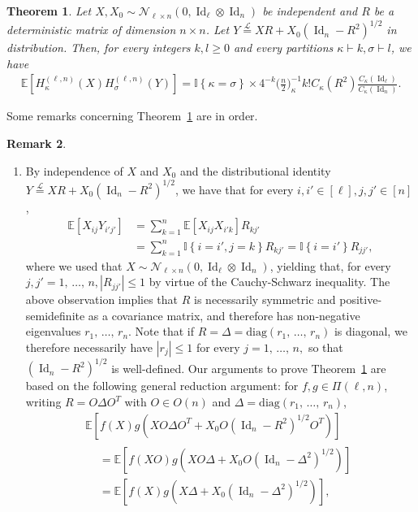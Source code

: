 \documentclass[10pt]{amsart}
\newtheorem{theo}{Theorem}[section]
\theoremstyle{definition}\newtheorem{defi}[theo]{Definition}\newtheorem{rema}[theo]{Remark}\newtheorem{exam}[theo]{Example}\newtheorem{exem}[theo]{Example}\newtheorem{nota}[theo]{Notation}
\DeclareMathOperator{\Id}{Id}
\newcommand{\scN}{\mathscr{N}}
\newcommand{\diag}{\mathrm{diag}}
\newcommand{\E}[1]{\mathbb{E}\left[#1\right]}
\newcommand{\eqLaw}{ \overset{\mathcal{L}}{=} }
\newcommand{\ind}[1]{\mathbb{I}
\left\{#1\right\}}
\newcommand*{\alphenumi}{\renewcommand*{\theenumi}{\alph{enumi}}}
\begin{document}
\begin{theo}\label{OrtA}
Let $X, X_0\sim \scN_{\ell \times n}(0, \Id_{\ell} \otimes \Id_n)$ be independent and $R$ be a deterministic matrix of dimension $n\times n$. Let $Y \eqLaw XR+X_0(\Id_n-R^2)^{1/2}$ in distribution. Then, for every integers $k,l \geq0$ and every partitions $\kappa \vdash k, \sigma\vdash l$, we have
\begin{gather}\label{RelOrtA}
\E{H_{\kappa}^{(\ell,n)}(X) H_{\sigma}^{(\ell,n)}(Y)} = \ind{\kappa=\sigma}\times 4^{-k}\bigg(\frac{n}{2}\bigg)_{\kappa}^{-1} k ! C_{\kappa}(R^2)\frac{C_{\kappa}(\Id_{\ell})}{C_{\kappa}(\Id_n)}.
\end{gather}
\end{theo}
Some remarks concerning Theorem~\ref{OrtA} are in order.
\begin{rema}\label{Rem:Ortho}\leavevmode
\begin{enumerate}\alphenumi
\item By independence of $X$ and $X_0$ and the distributional identity $Y \eqLaw XR+X_0(\Id_n-R^2)^{1/2}$, we have that for every $i,i'\in [\ell], j,j'\in [n]$,
\begin{align*}
\E{X_{ij}Y_{i'j'}} &= \sum_{k=1}^n\E{X_{ij}X_{i'k}}R_{kj'} \\
&= \sum_{k=1}^n \ind{i=i',j=k}R_{kj'} = \ind{i=i'}R_{jj'},
\end{align*}
where we used that $X\sim \scN_{\ell \times n}(0, \Id_{\ell} \otimes \Id_n)$, yielding that, for every $j,j'=1,\,\ldots,\,n, |R_{jj'}|\leq 1$ by virtue of the Cauchy-Schwarz inequality. The above observation implies that $R$ is necessarily symmetric and positive-semidefinite as a covariance matrix, and therefore has non-negative eigenvalues $r_1,\,\ldots,\,r_n$. Note that if $R=\Delta=\diag(r_1,\,\ldots,\,r_n)$ is diagonal, we therefore necessarily have $|r_j|\leq 1$ for every $j=1,\,\ldots,\,n,$ so that $(\Id_n-R^2)^{1/2}$ is well-defined. Our arguments to prove Theorem~\ref{OrtA} are based on the following general reduction argument: for $f,g\in \Pi(\ell,n)$, writing $R=O\Delta O^T$ with $O\in O(n)$ and $\Delta=\diag(r_1,\,\ldots,\,r_n)$,
\begin{multline*}
\E{f(X)g\left(XO\Delta O^T+X_0O\left(\Id_n-R^2\right)^{1/2}O^T\right)}\\
\begin{aligned}
&= \E{f(XO)g\left(XO\Delta +X_0O\left(\Id_n-\Delta^2\right)^{1/2}\right)}\\
&=\E{f(X)g\left(X\Delta +X_0\left(\Id_n-\Delta^2\right)^{1/2}\right)},
\end{aligned}

\end{multline*}
\end{enumerate}
\end{rema}
\end{document}
